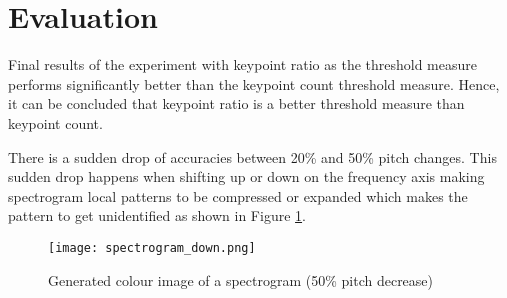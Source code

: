 \section{Evaluation}

Final results of the experiment with keypoint ratio as the threshold measure performs significantly better
than the keypoint count threshold measure. Hence, it can be concluded that keypoint ratio is a better
threshold measure than keypoint count.
\vspace{12pt}

There is a sudden drop of accuracies between 20\% and 50\% pitch changes. This sudden drop happens when shifting
up or down on the frequency axis making spectrogram local patterns to be compressed or expanded which makes the pattern
to get unidentified as shown in Figure \ref{fig:spectrogram_down}.


\begin{figure}[H]
    \centering
    \texttt{[image: spectrogram\_down.png]}
    \caption{Generated colour image of a spectrogram (50\% pitch decrease)}
    \label{fig:spectrogram_down}
  \end{figure}